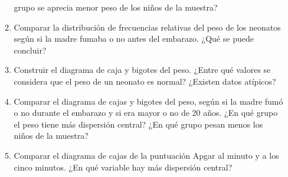\begin{enumerate}[leftmargin=*]
\begin{enumerate}
grupo se aprecia menor peso de los niños de la muestra?
\item Comparar la distribución de frecuencias relativas del peso de los neonatos según si la madre fumaba o no antes del
embarazo. ¿Qué se puede concluir?
\item Construir el diagrama de caja y bigotes del peso. ¿Entre qué valores se considera que el peso de un neonato es
normal? ¿Existen datos atípicos?
\item Comparar el diagrama de cajas y bigotes del peso, según si la madre fumó o no durante el embarazo y si era mayor o
no de 20 años. ¿En qué grupo el peso tiene más dispersión central? ¿En qué grupo pesan menos los niños de la
muestra?
\item Comparar el diagrama de cajas de la puntuación Apgar al minuto y a los cinco minutos. ¿En qué variable hay más
dispersión central?
\end{enumerate}  

\end{enumerate}
